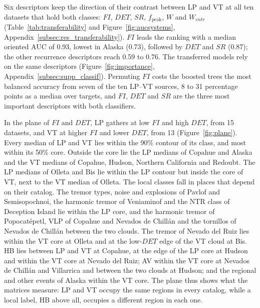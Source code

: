 \documentclass[pdflatex,sn-mathphys-num]{sn-jnl}
\begin{document}
Six descriptors keep the direction of their contrast between LP and VT at
all ten datasets that hold both classes: $FI$, $DET$, $SR$,
$f_{\text{peak}}$, $W$ and $W_{entr}$ (Table~\ref{tab:transferability} and
Figure~\ref{fig:aucsystems}, Appendix~\ref{subsec:res_transferability}). $FI$ leads the ranking with a median oriented AUC of
0.93, lowest in Alaska (0.73), followed by $DET$ and $SR$ (0.87); the other
recurrence descriptors reach 0.59 to 0.76. The transferred models rely on the same descriptors
(Figure~\ref{fig:importance}, Appendix~\ref{subsec:supp_classif}).
Permuting $FI$ costs the boosted trees the most balanced accuracy from seven
of the ten LP--VT sources, 8 to 31 percentage points as a median over
targets, and $FI$, $DET$ and $SR$ are the three most important descriptors
with both classifiers.

In the plane of $FI$ and $DET$, LP gathers at low $FI$ and high $DET$, from
15 datasets, and VT at higher $FI$ and lower $DET$, from 13
(Figure~\ref{fig:plane}). Every median of LP and VT lies within the 90\% contour of its class, and
most within its 50\% core. Outside the core lie the LP medians of Copahue
and Alaska and the VT medians of Copahue, Hudson, Northern California and
Redoubt. The LP medians of Olleta and Bis lie within
the LP contour but inside the core of VT, next to the VT median of Olleta.
The local classes fall in places that depend on their catalog. The tremor
types, noise and explosions of Pavlof and Semisopochnoi, the harmonic tremor
of Veniaminof and the NTR class of Deception Island lie within the LP core,
and the harmonic tremor of Popocat\'epetl, VLP of Copahue and Nevados de
Chill\'an and the tornillos of Nevados de Chill\'an between the two clouds.
The tremor of Nevado del Ruiz lies within the VT core at Olleta and at the
low-$DET$ edge of the VT cloud at Bis. HB lies between LP and VT at Copahue,
at the edge of the LP core at Hudson and within the VT core at Nevado del Ruiz; AV
within the VT core at Nevados de Chill\'an and Villarrica and between the two
clouds at Hudson; and the regional and other events of Alaska within the VT
core. The plane thus shows what the matrices measure: LP and VT occupy the
same regions in every catalog, while a local label, HB above all, occupies a
different region in each one.
\end{document}
